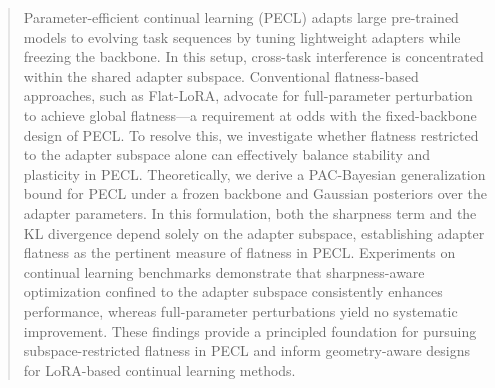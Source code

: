 \documentclass{article}
\theoremstyle{plain}
\theoremstyle{definition}
\theoremstyle{remark}
\begin{document}

\begin{abstract}

Parameter-efficient continual learning (PECL) adapts large pre-trained models to evolving task sequences by tuning lightweight adapters while freezing the backbone.
In this setup, cross-task interference is concentrated within the shared adapter subspace. Conventional flatness-based approaches, such as Flat-LoRA, advocate for full-parameter perturbation to achieve global flatness—a requirement at odds with the fixed-backbone design of PECL.
To resolve this, we investigate whether flatness restricted to the adapter subspace alone can effectively balance stability and plasticity in PECL. Theoretically, we derive a PAC-Bayesian generalization bound for PECL under a frozen backbone and Gaussian posteriors over the adapter parameters. In this formulation, both the sharpness term and the KL divergence depend solely on the adapter subspace, establishing adapter flatness as the pertinent measure of flatness in PECL.
Experiments on continual learning benchmarks demonstrate that sharpness-aware optimization confined to the adapter subspace consistently enhances performance, whereas full-parameter perturbations yield no systematic improvement. These findings provide a principled foundation for pursuing subspace-restricted flatness in PECL and inform geometry-aware designs for LoRA-based continual learning methods.



\end{abstract}
\end{document}
